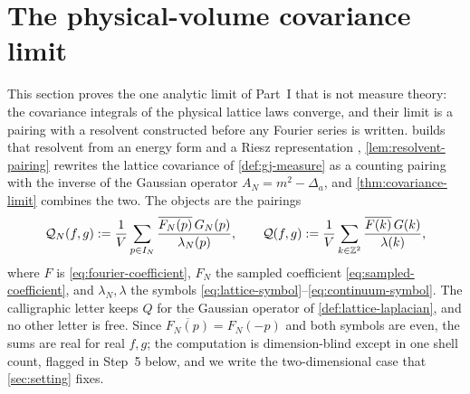 %
%
\section{The physical-volume covariance limit}\label{sec:covariance}

This section proves the one analytic limit of Part~I that is not measure theory:
the covariance integrals of the physical lattice laws converge, and their limit
is a pairing with a resolvent constructed before any Fourier series is written.
 builds that resolvent from an energy form and a Riesz
representation \cite{yosida1980}, \cref{lem:resolvent-pairing} rewrites the
lattice covariance of
\cref{def:gj-measure} as a counting pairing with the inverse of the Gaussian
operator $A_N=m^2-\Delta_a$, and \cref{thm:covariance-limit} combines the two.
The objects are the pairings
\begin{equation}\label{eq:pairings}
  \mathcal Q_N(f,g):=\frac1V\sum_{p\in I_N}
    \frac{\overline{F_N(p)}\,G_N(p)}{\lambda_N(p)},
  \qquad
  \mathcal Q(f,g):=\frac1V\sum_{k\in\mathbb{Z}^2}
    \frac{\overline{F(k)}\,G(k)}{\lambda(k)},
\end{equation}
where $F$ is \eqref{eq:fourier-coefficient}, $F_N$ the sampled coefficient
\eqref{eq:sampled-coefficient}, and $\lambda_N,\lambda$ the symbols
\eqref{eq:lattice-symbol}--\eqref{eq:continuum-symbol}. The calligraphic letter
keeps $Q$ for the Gaussian operator of \cref{def:lattice-laplacian}, and no
other letter is free. Since
$\overline{F_N(p)}=F_N(-p)$ and both symbols are even, the sums are real for
real $f,g$; the computation is dimension-blind except in one shell count,
flagged in Step~5 below, and we write the two-dimensional case that
\cref{sec:setting} fixes.

